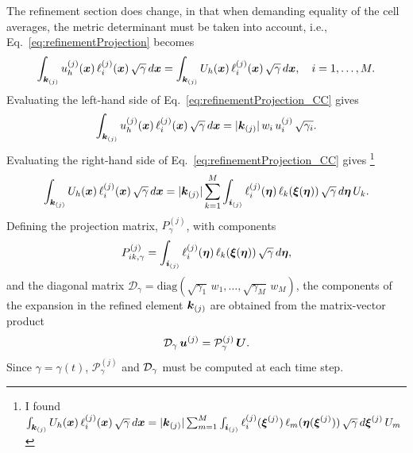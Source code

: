 \documentclass[10pt]{article}
\begin{document}
The refinement
section does change, in that when demanding equality of the cell averages, the metric determinant
must be taken into account, i.e., Eq.~\eqref{eq:refinementProjection} becomes
\begin{equation}
  \int_{\boldsymbol{k}_{(j)}}u_{h}^{(j)}(\boldsymbol{x})\,\ell_{i}^{(j)}(\boldsymbol{x})\,\sqrt{\gamma}\,d\boldsymbol{x}
  =\int_{\boldsymbol{k}_{(j)}}U_{h}(\boldsymbol{x})\,\ell_{i}^{(j)}(\boldsymbol{x})\,\sqrt{\gamma}\,d\boldsymbol{x},\quad i=1,\ldots,M.
  \label{eq:refinementProjection_CC}
\end{equation}
Evaluating the left-hand side of Eq.~\eqref{eq:refinementProjection_CC} gives
\begin{equation}
  \int_{\boldsymbol{k}_{(j)}}u_{h}^{(j)}(\boldsymbol{x})\,\ell_{i}^{(j)}(\boldsymbol{x})\,\sqrt{\gamma}\,d\boldsymbol{x}
  =|\boldsymbol{k}_{(j)}|\,w_{i}\,u_{i}^{(j)}\,\sqrt{\gamma_{i}}.
  \end{equation}
  Evaluating the right-hand side of Eq.~\eqref{eq:refinementProjection_CC} gives
  \footnote{I found  $\int_{\boldsymbol{k}_{(j)}}U_{h}(\boldsymbol{x})\,\ell_{i}^{(j)}(\boldsymbol{x})\,\sqrt{\gamma}\,d\boldsymbol{x}
  =|\boldsymbol{k}_{(j)}|\sum_{m=1}^{M}\int_{\boldsymbol{i}_{(j)}}\ell_{i}^{(j)}(\boldsymbol{\xi}^{(j)})\,\ell_{m}(\boldsymbol{\eta}(\boldsymbol{\xi}^{(j)}))\,\sqrt{\gamma}\,d\boldsymbol{\xi}^{(j)}\,U_{m}$}
  \begin{equation}
  \int_{\boldsymbol{k}_{(j)}}U_{h}(\boldsymbol{x})\,\ell_{i}^{(j)}(\boldsymbol{x})\,\sqrt{\gamma}\,d\boldsymbol{x}
  =|\boldsymbol{k}_{(j)}|\sum_{k=1}^{M}\int_{\boldsymbol{i}_{(j)}}\ell_{i}^{(j)}(\boldsymbol{\eta})\,\ell_{k}(\boldsymbol{\xi}(\boldsymbol{\eta}))\,\sqrt{\gamma}\,d\boldsymbol{\eta}\,U_{k}.
\end{equation}
Defining the projection matrix, $P^{\left(j\right)}_{\gamma}$, with components
\begin{equation}
P^{\left(j\right)}_{ik,\gamma}
=\int_{\boldsymbol{i}_{(j)}}\ell_{i}^{(j)}(\boldsymbol{\eta})\,\ell_{k}(\boldsymbol{\xi}(\boldsymbol{\eta}))\,\sqrt{\gamma}\,d\boldsymbol{\eta},
\end{equation}
and the diagonal matrix $\mathcal{D}_{\gamma}
=\mbox{diag}(\sqrt{\gamma_{1}}\,w_{1},\ldots,\sqrt{\gamma_{M}}\,w_{M})$, the components of the expansion in the refined element $\boldsymbol{k}_{(j)}$ are obtained from the matrix-vector product
\begin{equation}
  \mathcal{D}_{\gamma}\,\boldsymbol{u}^{(j)} = \mathcal{P}^{(j)}_{\gamma}\,\boldsymbol{U}.
\end{equation}
Since $\gamma=\gamma\left(t\right)$, $\mathcal{P}^{\left(j\right)}_{\gamma}$ and $\mathcal{D}_{\gamma}$
must be computed at each time step.
\end{document}
